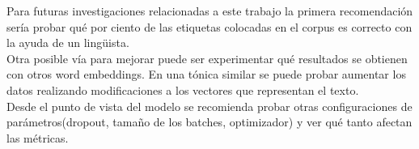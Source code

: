 \begin{recomendations}
    Para futuras investigaciones relacionadas a este trabajo la primera recomendación sería probar qué por ciento de las etiquetas colocadas en el corpus es correcto con la ayuda de un lingüista.\\
    Otra posible vía para mejorar puede ser experimentar qué resultados se obtienen con otros word embeddings. En una tónica similar se puede probar aumentar los datos realizando modificaciones a los vectores que representan el texto.\\
    Desde el punto de vista del modelo se recomienda probar otras configuraciones de parámetros(dropout, tamaño de los batches, optimizador) y ver qué tanto afectan las métricas.
\end{recomendations}
